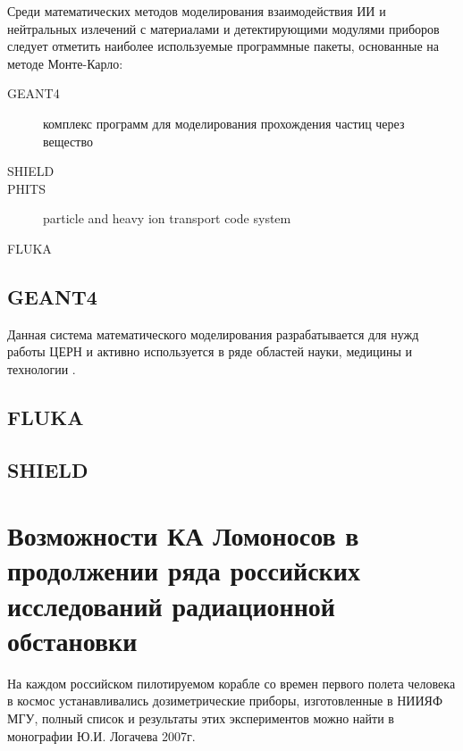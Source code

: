 Среди математических методов моделирования взаимодействия ИИ и нейтральных излечений с материалами и детектирующими модулями приборов следует отметить наиболее используемые программные пакеты, основанные на методе Монте-Карло:


\begin{description}
	\item[GEANT4] комплекс программ для моделирования прохождения частиц через вещество\cite{Allison2006}
	\item[SHIELD] 	
	\item[PHITS] particle and heavy ion transport code system
	\item[FLUKA] 
\end{description}

\subsection{GEANT4}

Данная система математического моделирования разрабатывается для нужд работы ЦЕРН и активно используется в ряде областей науки, медицины и технологии \cite{Agostinelli2003}.


\subsection{FLUKA}




\subsection{SHIELD}

\section{Возможности КА Ломоносов в продолжении ряда российских исследований радиационной обстановки}

На каждом российском пилотируемом корабле со времен первого полета человека в космос устанавливались дозиметрические приборы, изготовленные в НИИЯФ МГУ, полный список и результаты этих экспериментов можно найти в монографии Ю.И. Логачева 2007г.



